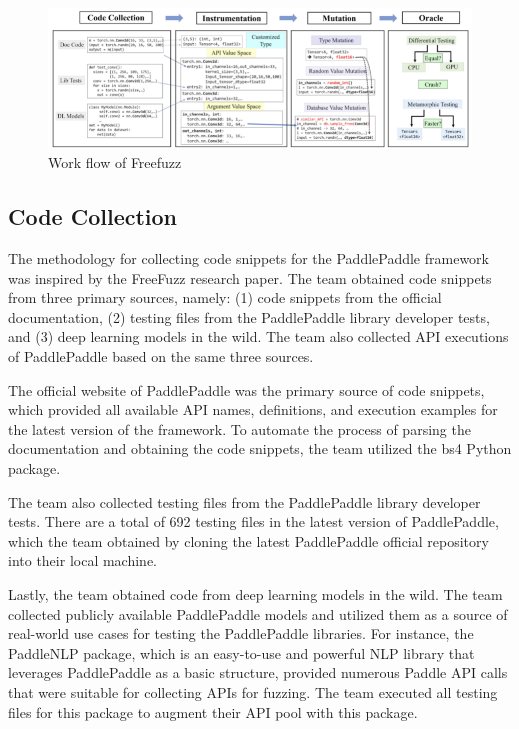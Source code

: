 \documentclass[sigconf]{acmart}
\begin{document}
  \begin{figure}[h]
    \centering
    \includegraphics[width=\linewidth]{1.png}
    \caption{Work flow of Freefuzz}
  \end{figure}
  \subsection{Code Collection}
  \par The methodology for collecting code snippets for the PaddlePaddle framework was inspired by the FreeFuzz research paper. 
  The team obtained code snippets from three primary sources, namely: (1) code snippets from the official documentation, 
  (2) testing files from the PaddlePaddle library developer tests, and (3) deep learning models in the wild. 
  The team also collected API executions of PaddlePaddle based on the same three sources.

  \par The official website of PaddlePaddle was the primary source of code snippets, which provided all available API names, 
  definitions, and execution examples for the latest version of the framework. To automate the process of parsing the documentation and obtaining the code snippets, 
  the team utilized the bs4 Python package. 

  \par The team also collected testing files from the PaddlePaddle library developer tests. 
  There are a total of 692 testing files in the latest version of PaddlePaddle, which the team obtained by cloning the latest PaddlePaddle official repository into their local machine.

  \par Lastly, the team obtained code from deep learning models in the wild. 
  The team collected publicly available PaddlePaddle models and utilized them as a source of real-world use cases for testing the PaddlePaddle libraries. 
  For instance, the PaddleNLP package, which is an easy-to-use and powerful NLP library that leverages PaddlePaddle as a basic structure, provided numerous Paddle API calls that were suitable for collecting APIs for fuzzing. 
  The team executed all testing files for this package to augment their API pool with this package.
    
\end{document}
